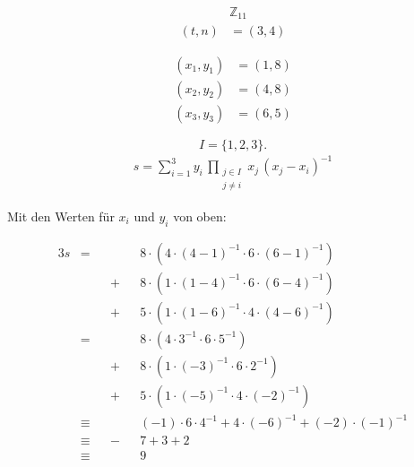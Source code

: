 \begin{align*}
&\mathbb{Z}_{11} \\
(t,n) &= (3,4)
\end{align*}

\begin{align*}
(x_1, y_1) &= (1,8) \\
(x_2, y_2) &= (4,8) \\
(x_3, y_3) &= (6,5)
\end{align*}

\[
I = \{1,2,3\}.
\]
\begin{align}
s = \sum_{i=1}^{3} y_i\, \prod_{\substack{j \in I \\ j\neq i}} x_j\,(x_j - x_i)^{-1}
\end{align}

Mit den Werten für $x_i$ und $y_i$ von oben:

\begin{alignat*}{3}
s &= &&\phantom{+} &&8\cdot(4\cdot(4-1)^{-1}\cdot6\cdot(6-1)^{-1}) \\
& &&+ &&8\cdot(1\cdot(1-4)^{-1}\cdot6\cdot(6-4)^{-1}) \\
& &&+ &&5\cdot(1\cdot(1-6)^{-1}\cdot4\cdot(4-6)^{-1}) \\
&= &&\phantom{+} &&8\cdot(4\cdot3^{-1}\cdot6\cdot5^{-1}) \\
& &&+ &&8\cdot(1\cdot(-3)^{-1}\cdot6\cdot2^{-1}) \\
& &&+ &&5\cdot(1\cdot(-5)^{-1}\cdot4\cdot(-2)^{-1}) \\
&\equiv &&\phantom{+} &&(-1)\cdot6\cdot4^{-1} + 4\cdot(-6)^{-1} + (-2)\cdot(-1)^{-1} \\
&\equiv &&- &&7 + 3 + 2 \\
&\equiv && &&9
\end{alignat*}
